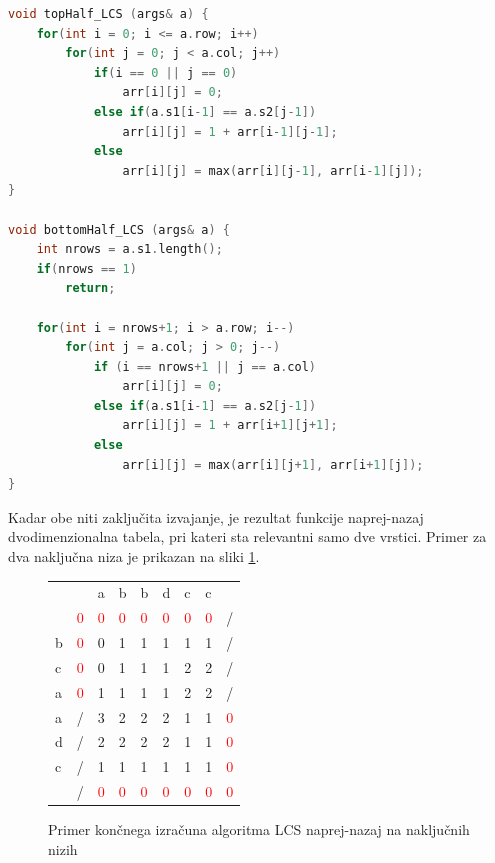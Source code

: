 \documentclass[a4paper,12pt,openright]{book}
\begin{document}
\bigskip
\begin{lstlisting}[language=C++, caption={Funkciji za računanje zgornje in spodnje polovice tabele za LCS}, captionpos=b, label=fbLCSthreads]
void topHalf_LCS (args& a) {
    for(int i = 0; i <= a.row; i++) 
        for(int j = 0; j < a.col; j++)
            if(i == 0 || j == 0)
                arr[i][j] = 0;        
            else if(a.s1[i-1] == a.s2[j-1])
                arr[i][j] = 1 + arr[i-1][j-1];
            else 
                arr[i][j] = max(arr[i][j-1], arr[i-1][j]);
}

void bottomHalf_LCS (args& a) {
    int nrows = a.s1.length();
    if(nrows == 1)
        return;

    for(int i = nrows+1; i > a.row; i--) 
        for(int j = a.col; j > 0; j--) 
            if (i == nrows+1 || j == a.col) 
                arr[i][j] = 0;
            else if(a.s1[i-1] == a.s2[j-1])
                arr[i][j] = 1 + arr[i+1][j+1];
            else
                arr[i][j] = max(arr[i][j+1], arr[i+1][j]);
}
\end{lstlisting}

Kadar obe niti zaključita izvajanje, je rezultat funkcije naprej-nazaj dvodimenzionalna tabela, pri kateri sta relevantni samo dve vrstici. Primer za dva naključna niza je prikazan na sliki \ref{fbLCSresult}.

\begin{figure}[htb]
\centering
\begin{tabular}{|l|l|l|l|l|l|l|l|l|}
\cline{3-8}
  \multicolumn{2}{c|}{}  & a & b & b & d & c & c & \multicolumn{1}{|c}{} \\ \cline{2-9}
 \multicolumn{1}{c|}{} & \textcolor{red}{0} & \textcolor{red}{0} & \textcolor{red}{0} & \textcolor{red}{0} & \textcolor{red}{0} & \textcolor{red}{0} & \textcolor{red}{0} & / \\ \hline
b  & \textcolor{red}{0}  & 0 & 1 & 1 & 1 & 1 & 1 & / \\ \hline
c  & \textcolor{red}{0} & 0 & 1 & 1 & 1 & 2 & 2 & / \\ \hline
a  & \cellcolor{blue!15}\textcolor{red}{0} & \cellcolor{blue!15}1 & \cellcolor{blue!15}1 & \cellcolor{blue!15}1 & \cellcolor{blue!15}1 & \cellcolor{blue!15}2 & \cellcolor{blue!15}2 & / \\ \hline
a  & / & \cellcolor{blue!15}3  & \cellcolor{blue!15}2 &  \cellcolor{blue!15}2 & \cellcolor{blue!15}2 & \cellcolor{blue!15}1 & \cellcolor{blue!15}1 & \cellcolor{blue!15}\textcolor{red}{0} \\ \hline
d  & / & 2 & 2 & 2 & 2 & 1 & 1 & \textcolor{red}{0} \\ \hline
c  & / & 1 & 1 & 1 & 1 & 1 & 1 & \textcolor{red}{0} \\ \hline
\multicolumn{1}{c|}{}  & / & \textcolor{red}{0} & \textcolor{red}{0} & \textcolor{red}{0} & \textcolor{red}{0} & \textcolor{red}{0} & \textcolor{red}{0} & \textcolor{red}{0} \\ \cline{2-9}
\end{tabular}
\caption{Primer končnega izračuna algoritma LCS naprej-nazaj na naključnih nizih}
\label{fbLCSresult}
\end{figure}
\end{document}
